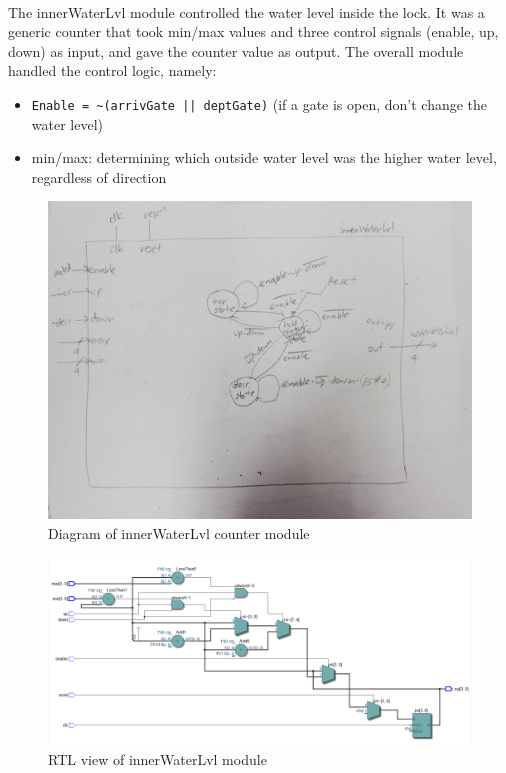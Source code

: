 \documentclass{article}
\begin{document}
      \paragraph{} The innerWaterLvl module controlled the water level inside the lock. It was a generic counter that took min/max values and three control signals (enable, up, down) as input, and gave the counter value as output. The overall module handled the control logic, namely:
      \begin{itemize}
        \item \lstinline{Enable = ~(arrivGate || deptGate)} (if a gate is open, don’t change the water level)
        \item min/max: determining which outside water level was the higher water level, regardless of direction
      \end{itemize}

      \begin{figure}[H]
        \centering
        \includegraphics[width=0.6\linewidth]{figures/block_diagrams/innerWaterLvl_diagram.jpeg}
        \caption{Diagram of innerWaterLvl counter module}
        \label{fig:innerWaterLvl_diagram}
      \end{figure}

      \begin{figure}[H]
        \centering
        \includegraphics[width=0.75\linewidth]{figures/innerWaterlvl_RTL.PNG}
        \caption{RTL view of innerWaterLvl module}
        \label{fig:innerWaterLvl_RTL}
      \end{figure}
\end{document}
